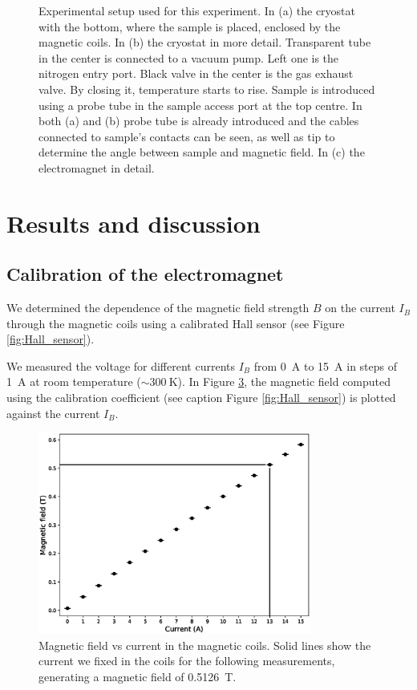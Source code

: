 \documentclass[11pt,a4paper]{article}
\begin{document}
\begin{figure}[H]
\begin{subfigure}[b]{0.6\textwidth}
\caption{}
\label{fig:electromagnet}
\end{subfigure}
\caption{Experimental setup used for this experiment. In (a) the cryostat with the bottom, where the sample is placed, enclosed by the magnetic coils. In (b) the cryostat in more detail. Transparent tube in the center is connected to a vacuum pump. Left one is the nitrogen entry port. Black valve in the center is the gas exhaust valve. By closing it, temperature starts to rise. Sample is introduced using a probe tube in the sample access port at the top centre. In both (a) and (b) probe tube is already introduced and the cables connected to sample's contacts can be seen, as well as tip to determine the angle between sample and magnetic field. In (c) the electromagnet in detail.}
\label{fig:experimental_setup_all}
\end{figure}

\section{Results and discussion}

\subsection{Calibration of the electromagnet}

We determined the dependence of the magnetic field strength $B$ on the current $I_B$ through the magnetic coils using a calibrated Hall sensor (see Figure \ref{fig:Hall_sensor}).

We measured the voltage for different currents $I_B$ from \SI{0}{\ampere} to \SI{15}{\ampere} in steps of \SI{1}{\ampere} at room temperature ($\sim\SI{300}{\kelvin}$). In Figure \ref{fig:magnetic_field}, the magnetic field computed using the calibration coefficient (see caption Figure \ref{fig:Hall_sensor}) is plotted against the current $I_B$.

\begin{figure}[H]
\centering
\includegraphics[width=0.8\textwidth]{Magnetic_field_vs_current.eps}
\caption{Magnetic field vs current in the magnetic coils. Solid lines show the current we fixed in the coils for the following measurements, generating a magnetic field of \SI{0.5126}{\tesla}.}
\label{fig:magnetic_field}
\end{figure}
\end{document}
